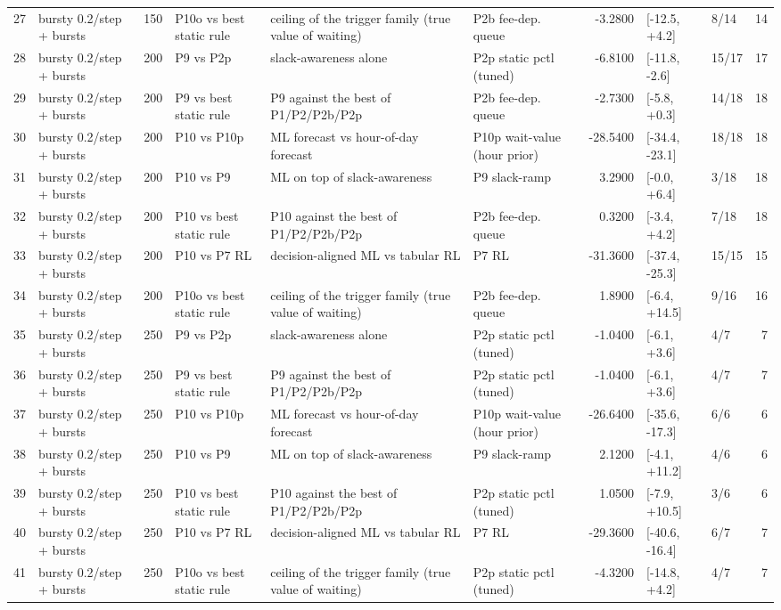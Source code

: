 \begin{tabular}{llrlllrllr}
27 & bursty 0.2/step + bursts & 150 & P10o vs best static rule & ceiling of the trigger family (true value of waiting) & P2b fee-dep. queue & -3.2800 & [-12.5, +4.2] & 8/14 & 14 \\
28 & bursty 0.2/step + bursts & 200 & P9 vs P2p & slack-awareness alone & P2p static pctl (tuned) & -6.8100 & [-11.8, -2.6] & 15/17 & 17 \\
29 & bursty 0.2/step + bursts & 200 & P9 vs best static rule & P9 against the best of P1/P2/P2b/P2p & P2b fee-dep. queue & -2.7300 & [-5.8, +0.3] & 14/18 & 18 \\
30 & bursty 0.2/step + bursts & 200 & P10 vs P10p & ML forecast vs hour-of-day forecast & P10p wait-value (hour prior) & -28.5400 & [-34.4, -23.1] & 18/18 & 18 \\
31 & bursty 0.2/step + bursts & 200 & P10 vs P9 & ML on top of slack-awareness & P9 slack-ramp & 3.2900 & [-0.0, +6.4] & 3/18 & 18 \\
32 & bursty 0.2/step + bursts & 200 & P10 vs best static rule & P10 against the best of P1/P2/P2b/P2p & P2b fee-dep. queue & 0.3200 & [-3.4, +4.2] & 7/18 & 18 \\
33 & bursty 0.2/step + bursts & 200 & P10 vs P7 RL & decision-aligned ML vs tabular RL & P7 RL & -31.3600 & [-37.4, -25.3] & 15/15 & 15 \\
34 & bursty 0.2/step + bursts & 200 & P10o vs best static rule & ceiling of the trigger family (true value of waiting) & P2b fee-dep. queue & 1.8900 & [-6.4, +14.5] & 9/16 & 16 \\
35 & bursty 0.2/step + bursts & 250 & P9 vs P2p & slack-awareness alone & P2p static pctl (tuned) & -1.0400 & [-6.1, +3.6] & 4/7 & 7 \\
36 & bursty 0.2/step + bursts & 250 & P9 vs best static rule & P9 against the best of P1/P2/P2b/P2p & P2p static pctl (tuned) & -1.0400 & [-6.1, +3.6] & 4/7 & 7 \\
37 & bursty 0.2/step + bursts & 250 & P10 vs P10p & ML forecast vs hour-of-day forecast & P10p wait-value (hour prior) & -26.6400 & [-35.6, -17.3] & 6/6 & 6 \\
38 & bursty 0.2/step + bursts & 250 & P10 vs P9 & ML on top of slack-awareness & P9 slack-ramp & 2.1200 & [-4.1, +11.2] & 4/6 & 6 \\
39 & bursty 0.2/step + bursts & 250 & P10 vs best static rule & P10 against the best of P1/P2/P2b/P2p & P2p static pctl (tuned) & 1.0500 & [-7.9, +10.5] & 3/6 & 6 \\
40 & bursty 0.2/step + bursts & 250 & P10 vs P7 RL & decision-aligned ML vs tabular RL & P7 RL & -29.3600 & [-40.6, -16.4] & 6/7 & 7 \\
41 & bursty 0.2/step + bursts & 250 & P10o vs best static rule & ceiling of the trigger family (true value of waiting) & P2p static pctl (tuned) & -4.3200 & [-14.8, +4.2] & 4/7 & 7 \\
\bottomrule
\end{tabular}
